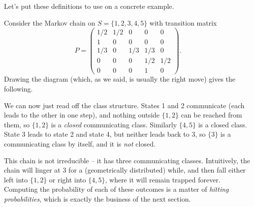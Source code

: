 \documentclass[a4paper]{scrartcl}
\begin{document}
Let's put these definitions to use on a concrete example.

\begin{example}
	Consider the Markov chain on $S = \{1, 2, 3, 4, 5\}$ with transition matrix
	$$
	P = \begin{pmatrix}
		1/2 & 1/2 & 0 & 0 & 0 \\
		1 & 0 & 0 & 0 & 0 \\
		1/3 & 0 & 1/3 & 1/3 & 0 \\
		0 & 0 & 0 & 1/2 & 1/2 \\
		0 & 0 & 0 & 1 & 0
	\end{pmatrix}.
	$$
	Drawing the diagram (which, as we said, is usually the right move) gives the following.

	\begin{center}
	\end{center}

	We can now just read off the class structure. States 1 and 2 communicate (each leads to the other in one step), and nothing outside $\{1, 2\}$ can be reached from them, so $\{1, 2\}$ is a \emph{closed} communicating class. Similarly $\{4, 5\}$ is a closed class. State 3 leads to state 2 and state 4, but neither leads back to 3, so $\{3\}$ is a communicating class by itself, and it is \emph{not} closed.

	This chain is not irreducible -- it has three communicating classes. Intuitively, the chain will linger at 3 for a (geometrically distributed) while, and then fall either left into $\{1, 2\}$ or right into $\{4, 5\}$, where it will remain trapped forever. Computing the probability of each of these outcomes is a matter of \emph{hitting probabilities}, which is exactly the business of the next section.
\end{example}
\end{document}
